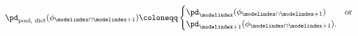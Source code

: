 \begin{equation}
  \pd_{\text{pool, dict}}(\phi_{\modelindex \cap \modelindex + 1}) \coloneqq
  \begin{cases}
    \pd_{\modelindex}(\phi_{\modelindex \cap \modelindex + 1}) & \text{or} \\
    \pd_{\modelindex + 1}(\phi_{\modelindex \cap \modelindex + 1}). &
  \end{cases}
  \label{eqn:dictatorial-def-three}
\end{equation}